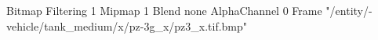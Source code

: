 {Bitmap
	{Filtering 1}
	{Mipmap 1}
	{Blend none}
	{AlphaChannel 0}
	{Frame "/entity/-vehicle/tank_medium/x/pz-3g_x/pz3_x.tif.bmp"}
}
